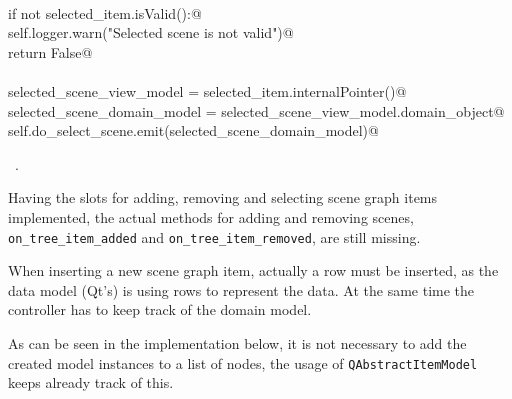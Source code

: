 \documentclass[
    a4paper,      %
    10pt,         %
    openright,    %
    notitlepage,  %
    parskip=half, %
]{scrreprt}       %
\theoremstyle{definition}                    %
\begin{document}
\begin{flushleft}
\begin{minipage}{\linewidth}
\begin{list}{}{}
\mbox{}\lstinline@@\\
\mbox{}\lstinline@    if not selected_item.isValid():@\\
\mbox{}\lstinline@        self.logger.warn("Selected scene is not valid")@\\
\mbox{}\lstinline@        return False@\\
\mbox{}\lstinline@@\\
\mbox{}\lstinline@    selected_scene_view_model = selected_item.internalPointer()@\\
\mbox{}\lstinline@    selected_scene_domain_model  = selected_scene_view_model.domain_object@\\
\mbox{}\lstinline@    self.do_select_scene.emit(selected_scene_domain_model)@{\NWsep}
\end{list}
\vspace{-1.5ex}
\footnotesize
\begin{list}{}{\setlength{\itemsep}{-\parsep}\setlength{\itemindent}{-\leftmargin}}
\item \NWtxtMacroRefIn\ .

\item{}
\end{list}
\end{minipage}\vspace{4ex}
\end{flushleft}
Having the slots for adding, removing and selecting scene graph items
implemented, the actual methods for adding and removing scenes,
\verb+on_tree_item_added+ and \verb+on_tree_item_removed+, are still missing.

When inserting a new scene graph item, actually a row must be inserted, as the
data model (Qt's) is using rows to represent the data. At the same time the
controller has to keep track of the domain model.

As can be seen in the implementation below, it is not necessary to add the
created model instances to a list of nodes, the usage of
\verb+QAbstractItemModel+ keeps already track of this.
\end{document}

